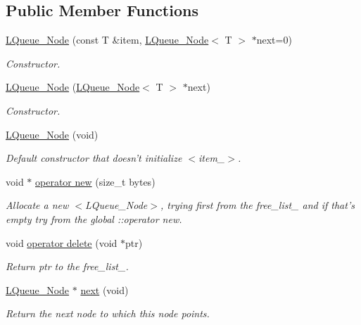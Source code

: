 \subsection*{Public Member Functions}
\begin{DoxyCompactItemize}
\item 
\hyperlink{classMadara_1_1Utility_1_1LQueue__Node_a03995529279f1b3db148e4e7aab893ae}{LQueue\_\-Node} (const T \&item, \hyperlink{classMadara_1_1Utility_1_1LQueue__Node}{LQueue\_\-Node}$<$ T $>$ $\ast$next=0)
\begin{DoxyCompactList}\small\item\em Constructor. \item\end{DoxyCompactList}\item 
\hyperlink{classMadara_1_1Utility_1_1LQueue__Node_aa7aee99c25e2b6b6e0984434357eaed6}{LQueue\_\-Node} (\hyperlink{classMadara_1_1Utility_1_1LQueue__Node}{LQueue\_\-Node}$<$ T $>$ $\ast$next)
\begin{DoxyCompactList}\small\item\em Constructor. \item\end{DoxyCompactList}\item 
\hyperlink{classMadara_1_1Utility_1_1LQueue__Node_a4745571b11a80c1c242c3ba5be3cd8c1}{LQueue\_\-Node} (void)
\begin{DoxyCompactList}\small\item\em Default constructor that doesn't initialize $<$item\_\-$>$. \item\end{DoxyCompactList}\item 
void $\ast$ \hyperlink{classMadara_1_1Utility_1_1LQueue__Node_a532b2724265d26f5c585c191b4952780}{operator new} (size\_\-t bytes)
\begin{DoxyCompactList}\small\item\em Allocate a new $<$LQueue\_\-Node$>$, trying first from the {\itshape free\_\-list\_\-\/} and if that's empty try from the global {\itshape ::operator new\/}. \item\end{DoxyCompactList}\item 
void \hyperlink{classMadara_1_1Utility_1_1LQueue__Node_a6f9d6f880c667530628b6c8a97a69a8a}{operator delete} (void $\ast$ptr)
\begin{DoxyCompactList}\small\item\em Return {\itshape ptr\/} to the {\itshape free\_\-list\_\-\/}. \item\end{DoxyCompactList}\item 
\hyperlink{classMadara_1_1Utility_1_1LQueue__Node}{LQueue\_\-Node} $\ast$ \hyperlink{classMadara_1_1Utility_1_1LQueue__Node_a6bc4f5e0f5ed1a0f251c1e507c2109f7}{next} (void)
\begin{DoxyCompactList}\small\item\em Return the next node to which this node points. \item\end{DoxyCompactList}\end{DoxyCompactItemize}
